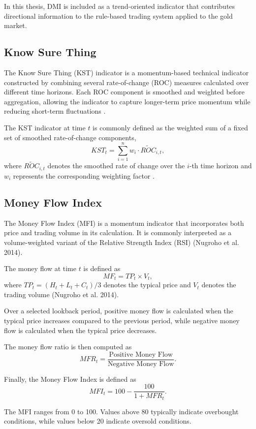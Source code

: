 In this thesis, DMI is included as a trend-oriented indicator that contributes
directional information to the rule-based trading system applied to the
gold market.

\subsection{Know Sure Thing}

The Know Sure Thing (KST) indicator is a momentum-based technical indicator
constructed by combining several rate-of-change (ROC) measures calculated
over different time horizons. Each ROC component is smoothed and weighted
before aggregation, allowing the indicator to capture longer-term price
momentum while reducing short-term fluctuations \citep{saud2024technical}.

The KST indicator at time $t$ is commonly defined as the weighted sum of a fixed
set of smoothed rate-of-change components,
\[
KST_t = \sum_{i=1}^{n} w_i \cdot \widetilde{ROC}_{i,t},
\]
where $\widetilde{ROC}_{i,t}$ denotes the smoothed rate of change over the
$i$-th time horizon and $w_i$ represents the corresponding weighting factor
\citep{saud2024technical}.

\subsection{Money Flow Index}

The Money Flow Index (MFI) is a momentum indicator that incorporates both
price and trading volume in its calculation. It is commonly interpreted as a
volume-weighted variant of the Relative Strength Index (RSI)
(Nugroho et al. 2014).

The money flow at time $t$ is defined as
\[
MF_t = TP_t \times V_t,
\]
where $TP_t = (H_t + L_t + C_t)/3$ denotes the typical price and $V_t$ denotes
the trading volume (Nugroho et al. 2014).

Over a selected lookback period, positive money flow is calculated when the
typical price increases compared to the previous period, while negative money
flow is calculated when the typical price decreases.

The money flow ratio is then computed as
\[
MFR_t = \frac{\text{Positive Money Flow}}{\text{Negative Money Flow}}.
\]

Finally, the Money Flow Index is defined as
\[
MFI_t = 100 - \frac{100}{1 + MFR_t}.
\]

The MFI ranges from 0 to 100. Values above 80 typically indicate
overbought conditions, while values below 20 indicate oversold conditions.

